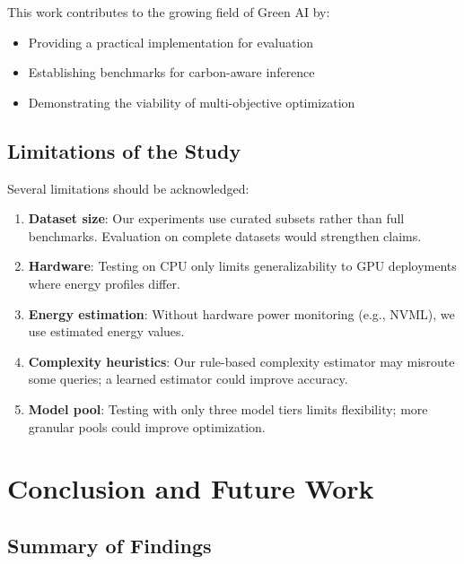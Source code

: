 \documentclass[conference]{IEEEtran}
\begin{document}
This work contributes to the growing field of Green AI by:
\begin{itemize}
    \item Providing a practical implementation for evaluation
    \item Establishing benchmarks for carbon-aware inference
    \item Demonstrating the viability of multi-objective optimization
\end{itemize}

\subsection{Limitations of the Study}

Several limitations should be acknowledged:

\begin{enumerate}
    \item \textbf{Dataset size}: Our experiments use curated subsets rather than full benchmarks. Evaluation on complete datasets would strengthen claims.
    
    \item \textbf{Hardware}: Testing on CPU only limits generalizability to GPU deployments where energy profiles differ.
    
    \item \textbf{Energy estimation}: Without hardware power monitoring (e.g., NVML), we use estimated energy values.
    
    \item \textbf{Complexity heuristics}: Our rule-based complexity estimator may misroute some queries; a learned estimator could improve accuracy.
    
    \item \textbf{Model pool}: Testing with only three model tiers limits flexibility; more granular pools could improve optimization.
\end{enumerate}

\section{Conclusion and Future Work}

\subsection{Summary of Findings}
\end{document}
